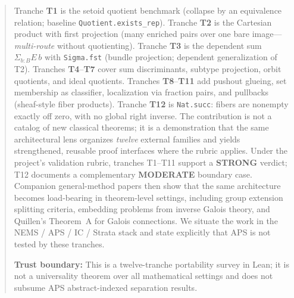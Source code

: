 \documentclass[11pt]{article}
\begin{document}
\begin{abstract}
Tranche \textbf{T1} is the setoid quotient benchmark (collapse by an equivalence relation;
baseline \texttt{Quotient.exists\_rep}). Tranche \textbf{T2} is the Cartesian product with
first projection (many enriched pairs over one bare image---\emph{multi-route} without
quotienting). Tranche \textbf{T3} is the dependent sum $\Sigma_{b:B} E\,b$ with
\texttt{Sigma.fst} (bundle projection; dependent generalization of T2). Tranches
\textbf{T4}--\textbf{T7} cover sum discriminants, subtype projection, orbit quotients, and
ideal quotients. Tranches \textbf{T8}--\textbf{T11} add pushout glueing, set membership as
classifier, localization via fraction pairs, and pullbacks (sheaf-style fiber products).
Tranche \textbf{T12} is \texttt{Nat.succ}: fibers are nonempty exactly off zero, with no
global right inverse. The contribution is
not a catalog of new classical theorems; it is a demonstration that the same architectural
lens organizes \emph{twelve} external families and yields strengthened, reusable proof
interfaces where the rubric applies. Under the project's validation rubric, tranches T1--T11
support a \textbf{STRONG} verdict; T12 documents a complementary \textbf{MODERATE} boundary
case. Companion general-method papers then show that the same architecture
becomes load-bearing in theorem-level settings, including group extension
splitting criteria, embedding problems from inverse Galois theory, and
Quillen's Theorem~A for Galois connections. We situate
the work in the NEMS / APS / IC / Strata stack and state explicitly that APS is not tested
by these tranches.

\textbf{Trust boundary:} This is a twelve-tranche portability survey in Lean; it is not a universality theorem over all mathematical settings and does not subsume APS abstract-indexed separation results.
\end{abstract}



\end{document}
